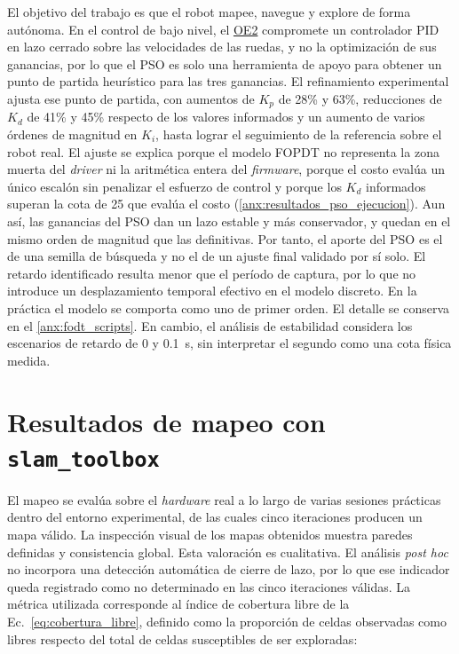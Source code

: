 El objetivo del trabajo es que el robot mapee, navegue y explore de forma
autónoma. En el control de bajo nivel, el \hyperref[oe2]{OE2} compromete un
controlador PID en lazo cerrado sobre las velocidades de las ruedas, y no la
optimización de sus ganancias, por lo que el PSO es solo una herramienta de
apoyo para obtener un punto de partida heurístico para las tres ganancias. El
refinamiento experimental ajusta ese punto de partida, con aumentos de $K_p$ de
28\% y 63\%, reducciones de $K_d$ de 41\% y 45\% respecto de los valores
informados y un aumento de varios órdenes de magnitud en $K_i$, hasta lograr el
seguimiento de la referencia sobre el robot real. El ajuste se explica porque el
modelo FOPDT no representa la zona muerta del \textit{driver} ni la aritmética
entera del \textit{firmware}, porque el costo evalúa un único escalón sin
penalizar el esfuerzo de control y porque los $K_d$ informados superan la cota
de 25 que evalúa el costo (\ref{anx:resultados_pso_ejecucion}). Aun así, las
ganancias del PSO dan un lazo estable y más conservador, y quedan en el mismo
orden de magnitud que las definitivas. Por tanto, el aporte del PSO es el de una semilla de
búsqueda y no el de un ajuste final validado por sí solo. El retardo
identificado resulta menor que el período de captura, por lo que no introduce
un desplazamiento temporal efectivo en el modelo discreto. En la práctica el
modelo se comporta como uno de primer orden. El detalle se conserva en el
\ref{anx:fodt_scripts}. En cambio, el análisis de estabilidad considera
los escenarios de retardo de 0 y 0.1~s, sin interpretar el segundo como una
cota física medida.

\section{Resultados de mapeo con \texttt{slam\_toolbox}}
\label{sec:resultados_slam}

El mapeo se evalúa sobre el \textit{hardware} real a lo largo de varias sesiones prácticas dentro del entorno experimental, de las cuales cinco iteraciones producen un mapa válido. La inspección visual de los mapas obtenidos muestra paredes definidas y consistencia global. Esta valoración es cualitativa. El análisis \textit{post hoc} no incorpora una detección automática de cierre de lazo, por lo que ese indicador queda registrado como no determinado en las cinco iteraciones válidas.
La métrica utilizada corresponde al índice de cobertura libre de la
Ec.~\eqref{eq:cobertura_libre}, definido como la proporción de celdas
observadas como libres respecto del total de celdas susceptibles de ser
exploradas:

